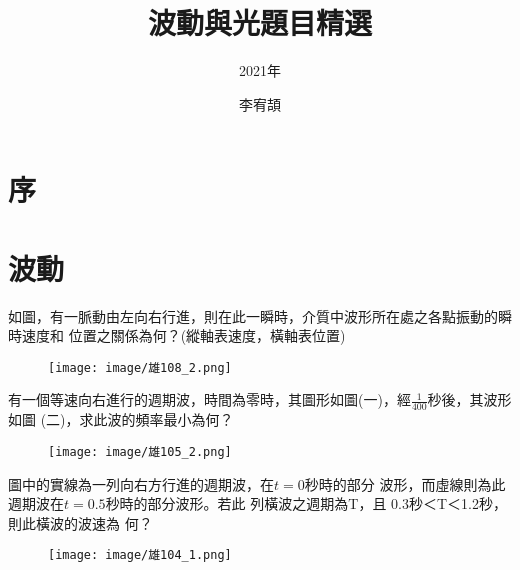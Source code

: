 \documentclass[cn,10pt,math=newtx,chinesefont=founder]{elegantbook}
\title{波動與光題目精選}
\subtitle{2021年}
\author{李宥頡}
\institute{National Taiwan University}
\begin{document}
\maketitle
\frontmatter

\chapter*{序}
\tableofcontents

\mainmatter

\chapter{波動}
\begin{example}
    如圖，有一脈動由左向右行進，則在此一瞬時，介質中波形所在處之各點振動的瞬時速度和
    位置之關係為何？(縱軸表速度，橫軸表位置)\\
    \rightline{[雄中科學班108]}

\end{example}
\begin{solution}

\end{solution}
\begin{figure}[htbp]
    \texttt{[image: image/雄108\_2.png]}
\end{figure}
\newpage

\begin{example}
    有一個等速向右進行的週期波，時間為零時，其圖形如圖(一)，經$\frac{1}{400}$秒後，其波形如圖
    (二)，求此波的頻率最小為何？\\
    \rightline{[雄中科學班105]}
\end{example}
\begin{solution}
    
\end{solution}
\begin{figure}[htbp]
    \flushright
    \texttt{[image: image/雄105\_2.png]}
\end{figure}
\newpage

\begin{example}
    圖中的實線為一列向右方行進的週期波，在$t=0$秒時的部分
    波形，而虛線則為此週期波在$t =0.5$秒時的部分波形。若此
    列橫波之週期為T，且 0.3秒＜T＜1.2秒，則此橫波的波速為
    何？\\
    \rightline{[雄中科學班104]}
\end{example}
\begin{solution}
    
\end{solution}
\begin{figure}[htbp]
    \flushright
    \texttt{[image: image/雄104\_1.png]}
\end{figure}
\end{document}
